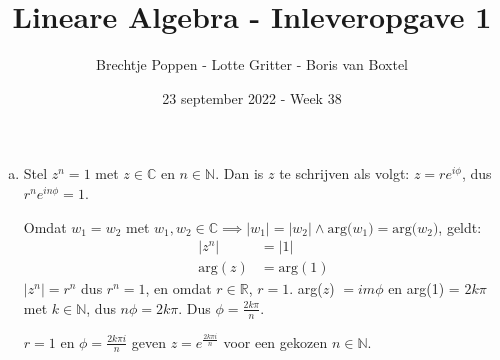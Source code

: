 \documentclass[12pt, a4paper]{article}
\begin{document}
\title{Lineare Algebra - Inleveropgave 1}
\author{Brechtje Poppen - Lotte Gritter - Boris van Boxtel}
\date{23 september 2022 - Week 38} 

\maketitle
{}

\begin{enumerate}[(a).]
    \item \label{opdrachta}
    Stel $z^n = 1$ met $z \in \mathbb{C}$ en $n \in \mathbb{N}$. Dan is $z$ te schrijven als volgt: $z = re^{i\phi}$, dus $r^ne^{in\phi} = 1$.

    Omdat $w_1 = w_2$ met $w_1,w_2 \in \mathbb{C} \implies |w_1|=|w_2| \land \text{arg($w_1$)} = \text{arg($w_2$)}$, geldt:
    \begin{equation}
        \begin{split}
            |z^n| &= |1| \\
            \text{arg}(z) &= \text{arg}(1)
        \end{split}
    \end{equation}
    $|z^n| = r^n$ dus $r^n = 1$, en omdat $r \in \mathbb{R}$, $r = 1$. arg($z$) $= im\phi$ en arg(1) = $2k\pi$ met $k \in \mathbb{N}$, dus $n\phi = 2k\pi$. Dus $\phi = \frac{2k\pi}{n}$.

    $r = 1$ en $\phi = \frac{2k\pi i}{n}$ geven $z = e^{\frac{2k\pi i}{n}}$ voor een gekozen $n \in \mathbb{N}$.


\end{enumerate}
\end{document}
